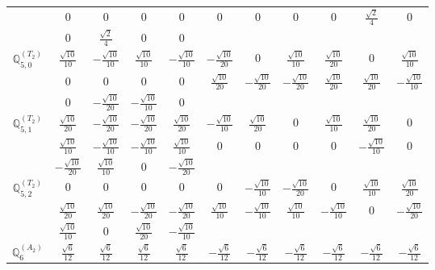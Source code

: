 \documentclass[fleqn,10pt,landscape]{article}
\begin{document}
\begin{itemize}
{\begin{center}
\begin{longtable}{ccccccccccc}
& $ 0 $ & $ 0 $ & $ 0 $ & $ 0 $ & $ 0 $ & $ 0 $ & $ 0 $ & $ 0 $ & $ \frac{\sqrt{2}}{4} $ & $ 0 $ \\
& $ 0 $ & $ \frac{\sqrt{2}}{4} $ & $ 0 $ & $ 0 $ & $  $ & $  $ & $  $ & $  $ & $  $ & $  $ \\ \hline
$\mathbb{Q}_{5,0}^{(T_{2})}$ & $ \frac{\sqrt{10}}{10} $ & $ - \frac{\sqrt{10}}{10} $ & $ \frac{\sqrt{10}}{10} $ & $ - \frac{\sqrt{10}}{10} $ & $ - \frac{\sqrt{10}}{20} $ & $ 0 $ & $ \frac{\sqrt{10}}{10} $ & $ \frac{\sqrt{10}}{20} $ & $ 0 $ & $ \frac{\sqrt{10}}{10} $ \\
& $ 0 $ & $ 0 $ & $ 0 $ & $ 0 $ & $ \frac{\sqrt{10}}{20} $ & $ - \frac{\sqrt{10}}{20} $ & $ - \frac{\sqrt{10}}{20} $ & $ \frac{\sqrt{10}}{20} $ & $ \frac{\sqrt{10}}{20} $ & $ - \frac{\sqrt{10}}{10} $ \\
& $ 0 $ & $ - \frac{\sqrt{10}}{20} $ & $ - \frac{\sqrt{10}}{10} $ & $ 0 $ & $  $ & $  $ & $  $ & $  $ & $  $ & $  $ \\ \hline
$\mathbb{Q}_{5,1}^{(T_{2})}$ & $ \frac{\sqrt{10}}{20} $ & $ - \frac{\sqrt{10}}{20} $ & $ - \frac{\sqrt{10}}{20} $ & $ \frac{\sqrt{10}}{20} $ & $ - \frac{\sqrt{10}}{10} $ & $ \frac{\sqrt{10}}{20} $ & $ 0 $ & $ \frac{\sqrt{10}}{10} $ & $ \frac{\sqrt{10}}{20} $ & $ 0 $ \\
& $ \frac{\sqrt{10}}{10} $ & $ - \frac{\sqrt{10}}{10} $ & $ - \frac{\sqrt{10}}{10} $ & $ \frac{\sqrt{10}}{10} $ & $ 0 $ & $ 0 $ & $ 0 $ & $ 0 $ & $ - \frac{\sqrt{10}}{10} $ & $ 0 $ \\
& $ - \frac{\sqrt{10}}{20} $ & $ \frac{\sqrt{10}}{10} $ & $ 0 $ & $ - \frac{\sqrt{10}}{20} $ & $  $ & $  $ & $  $ & $  $ & $  $ & $  $ \\ \hline
$\mathbb{Q}_{5,2}^{(T_{2})}$ & $ 0 $ & $ 0 $ & $ 0 $ & $ 0 $ & $ 0 $ & $ - \frac{\sqrt{10}}{10} $ & $ - \frac{\sqrt{10}}{20} $ & $ 0 $ & $ \frac{\sqrt{10}}{10} $ & $ \frac{\sqrt{10}}{20} $ \\
& $ \frac{\sqrt{10}}{20} $ & $ \frac{\sqrt{10}}{20} $ & $ - \frac{\sqrt{10}}{20} $ & $ - \frac{\sqrt{10}}{20} $ & $ \frac{\sqrt{10}}{10} $ & $ - \frac{\sqrt{10}}{10} $ & $ \frac{\sqrt{10}}{10} $ & $ - \frac{\sqrt{10}}{10} $ & $ 0 $ & $ - \frac{\sqrt{10}}{20} $ \\
& $ \frac{\sqrt{10}}{10} $ & $ 0 $ & $ \frac{\sqrt{10}}{20} $ & $ - \frac{\sqrt{10}}{10} $ & $  $ & $  $ & $  $ & $  $ & $  $ & $  $ \\ \hline
$\mathbb{Q}_{6}^{(A_{2})}$ & $ \frac{\sqrt{6}}{12} $ & $ \frac{\sqrt{6}}{12} $ & $ \frac{\sqrt{6}}{12} $ & $ \frac{\sqrt{6}}{12} $ & $ - \frac{\sqrt{6}}{12} $ & $ - \frac{\sqrt{6}}{12} $ & $ - \frac{\sqrt{6}}{12} $ & $ - \frac{\sqrt{6}}{12} $ & $ - \frac{\sqrt{6}}{12} $ & $ - \frac{\sqrt{6}}{12} $ \\

\end{longtable}
\end{center}}
\end{itemize}
\end{document}
